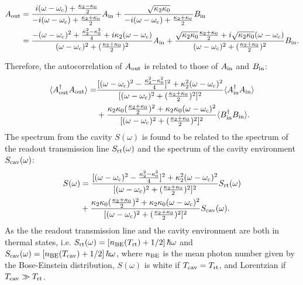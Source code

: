\begin{equation} \label{eq:output_field}
\begin{split}
	 A_{\rm out} & =  \frac{i(\omega - \omega_{\rm c}) + \frac{\kappa_2-\kappa_0}{2}}{-i(\omega - \omega_{\rm c}) + \frac{\kappa_2+\kappa_0}{2}} A_{\rm in} + \frac{\sqrt{\kappa_2 \kappa_0}}{-i(\omega - \omega_{\rm c}) + \frac{\kappa_2+\kappa_0}{2}} B_{\rm in} \\
                           & = \frac{-(\omega-\omega_{\rm c})^2 + \frac{\kappa_2^2-\kappa_0^2}{4}+i\kappa_2(\omega-\omega_{\rm c})}{(\omega-\omega_{\rm c})^2+(\frac{\kappa_2+\kappa_0}{2})^2} A_{\rm in} + \frac{\sqrt{\kappa_2\kappa_0}\frac{\kappa_2+\kappa_0}{2}+i\sqrt{\kappa_2\kappa_0}(\omega-\omega_{\rm c})}{(\omega-\omega_{\rm c})^2+(\frac{\kappa_2+\kappa_0}{2})^2} B_{\rm in}.
\end{split}
\end{equation}

Therefore, the autocorrelation of $A_{\rm out}$ is related to those of $A_{\rm in}$ and $B_{\rm in}$:
\begin{equation}
\label{eq:autocorrelation}
\begin{split}
    \langle A_{\rm out}^\dagger A_{\rm out} \rangle  = & \frac{[(\omega-\omega_{\rm c})^2 - \frac{\kappa_2^2-\kappa_0^2}{4}]^2+\kappa_2^2(\omega-\omega_{\rm c})^2}{[(\omega-\omega_{\rm c})^2+(\frac{\kappa_2+\kappa_0}{2})^2]^2} \langle A_{\rm in}^\dagger A_{\rm in} \rangle \\ & +  \frac{\kappa_2\kappa_0(\frac{\kappa_2+\kappa_0}{2})^2+\kappa_2\kappa_0(\omega-\omega_{\rm c})^2}{[(\omega-\omega_{\rm c})^2+(\frac{\kappa_2+\kappa_0}{2})^2]^2}\langle B_{\rm in}^\dagger B_{\rm in} \rangle.
\end{split}
\end{equation}
The spectrum from the cavity $S(\omega)$ is found to be related to the spectrum 
of the readout transmission line $S_{\rm rt}(\omega)$ and the spectrum of the 
cavity environment $S_{\rm cav}(\omega)$:
\begin{equation}
\label{eq:spectrum_relation}
\begin{split}
    S(\omega) & = \frac{[(\omega-\omega_{\rm c})^2 - \frac{\kappa_2^2-\kappa_0^2}{4}]^2+\kappa_2^2(\omega-\omega_{\rm c})^2}{[(\omega-\omega_{\rm c})^2+(\frac{\kappa_2+\kappa_0}{2})^2]^2} S_{\rm rt}(\omega) \\ & + \frac{\kappa_2\kappa_0(\frac{\kappa_2+\kappa_0}{2})^2+\kappa_2\kappa_0(\omega-\omega_{\rm c})^2}{[(\omega-\omega_{\rm c})^2+(\frac{\kappa_2+\kappa_0}{2})^2]^2}S_{\rm cav}(\omega).
\end{split}
\end{equation}
As the the readout transmission line and the cavity environment are both in 
thermal states, i.e. $S_{\rm rt}(\omega)=\left[n_{\rm BE}(T_{\rm rt})+1/2\right]\hbar\omega$ 
and $S_{\rm cav}(\omega)=\left[n_{\rm BE}(T_{\rm cav})+1/2\right]\hbar\omega$, where 
$n_{\rm BE}$ is the mean photon number given by the Bose-Einstein distribution, 
$S(\omega)$ is white if $T_{\rm cav}=T_{\rm rt}$, and Lorentzian if 
$T_{\rm cav} \gg T_{\rm rt}$.

